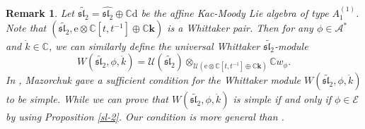 \documentclass[12pt, a4paper]{amsart}
\newcommand{\C}{\mathbb{C}}
\newcommand{\rd}{\mathrm{d}}
\newcommand{\re}{\mathrm{e}}
\newcommand{\U}{\mathcal{U}}
\theoremstyle{Theorem}
\theoremstyle{Theorem}
\newtheorem{remark}[thm]{Remark}
\numberwithin{equation}{section}
\begin{document}
\begin{remark} Let $\widetilde{\mathfrak{sl}_{2}}=\widehat{\mathfrak{sl}_{2}}\oplus\C\bm{\rd}$
be the affine Kac-Moody Lie algebra of type $A_{1}^{(1)}$. Note that
$(\widetilde{\mathfrak{sl}_{2}},\re\otimes\C[t,t^{-1}]\oplus\C\bm{k})$ is a Whittaker pair. Then
for any $\phi\in\mathcal{A}^*$ and $\dot{k}\in\C$, we can similarly
define the universal Whittaker $\widetilde{\mathfrak{sl}_{2}}$-module
\[W(\widetilde{\mathfrak{sl}_{2}},\phi,\dot{k})=\U(\widetilde{\mathfrak{sl}_{2}})
\otimes_{\U(\re\otimes\C[t,t^{-1}]\oplus\C\bm{k})}\C w_{\phi}.\]
In \cite{M}, Mazorchuk gave a sufficient condition for the Whittaker module
$W(\widetilde{\mathfrak{sl}_{2}},\phi,\dot{k})$ to be simple.
While we can prove that $W(\widetilde{\mathfrak{sl}_{2}},\phi,\dot{k})$ is simple if and only if
$\phi\in\mathcal{E}$ by using Proposition \ref{sl-2}. Our condition is more general than \cite{M}.
\end{remark}
\end{document}
